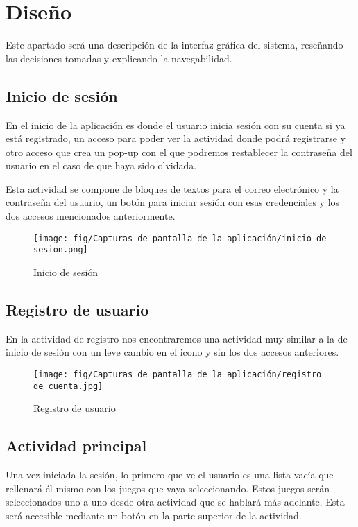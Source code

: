 \chapter{Diseño}\label{cap:diseño}

Este apartado será una descripción de la interfaz gráfica del sistema, reseñando las decisiones tomadas y explicando la navegabilidad.

\section{Inicio de sesión}

En el inicio de la aplicación es donde el usuario inicia sesión con su cuenta si ya está registrado, un acceso para poder ver la actividad donde podrá registrarse y otro acceso que crea un pop-up con el que podremos restablecer la contraseña del usuario en el caso de que haya sido olvidada.

Esta actividad se compone de bloques de textos para el correo electrónico y la contraseña del usuario, un botón para iniciar sesión con esas credenciales y los dos accesos mencionados anteriormente.

\begin{figure}[H]
    \centering
    \texttt{[image: fig/Capturas de pantalla de la aplicación/inicio de sesion.png]}
    \caption{Inicio de sesión}
    \label{fig:inicio sesion}
\end{figure}

\section{Registro de usuario}

En la actividad de registro nos encontraremos una actividad muy similar a la de inicio de sesión con un leve cambio en el icono y sin los dos accesos anteriores.

\begin{figure}[H]
    \centering
    \texttt{[image: fig/Capturas de pantalla de la aplicación/registro de cuenta.jpg]}
    \caption{Registro de usuario}
    \label{fig:registro usuario}
\end{figure}

\section{Actividad principal}

Una vez iniciada la sesión, lo primero que ve el usuario es una lista vacía que rellenará él mismo con los juegos que vaya seleccionando. Estos juegos serán seleccionados uno a uno desde otra actividad que se hablará más adelante. Esta será accesible mediante un botón en la parte superior de la actividad.

